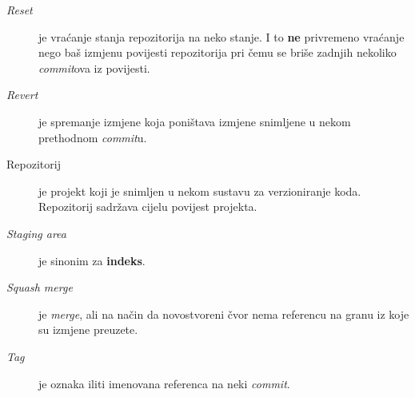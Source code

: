 \begin{description}
    \item[\emph{Reset}] je vraćanje stanja repozitorija na neko stanje. I to \textbf{ne} privremeno vraćanje nego baš izmjenu povijesti repozitorija pri čemu se briše zadnjih nekoliko \emph{commit}ova iz povijesti.
    \item[\emph{Revert}] je spremanje izmjene koja poništava izmjene snimljene u nekom prethodnom \emph{commit}u.
    \item[Repozitorij] je projekt koji je snimljen u nekom sustavu za verzioniranje koda. Repozitorij sadržava cijelu povijest projekta.
    \item[\emph{Staging area}] je sinonim za \textbf{indeks}.
    \item[\emph{Squash merge}] je \emph{merge}, ali na način da novostvoreni čvor nema referencu na granu iz koje su izmjene preuzete.
    \item[\emph{Tag}] je oznaka iliti imenovana referenca na neki \emph{commit}.
\end{description}


